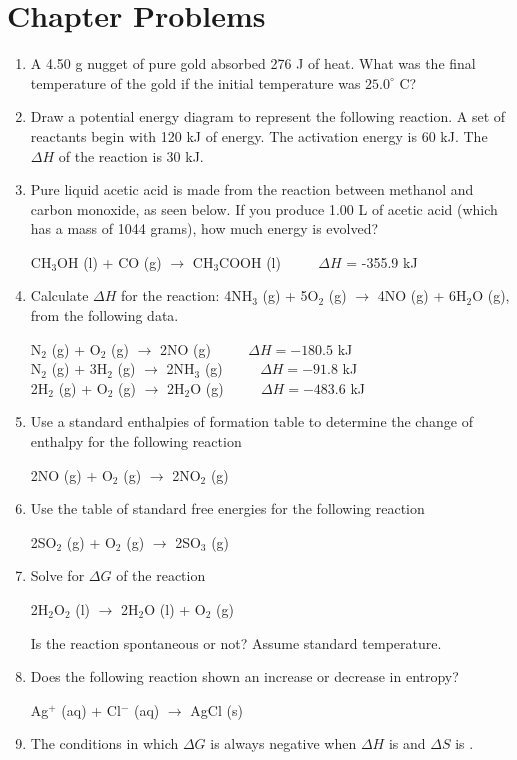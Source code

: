 \documentclass[../hchem.tex]{subfiles}
\begin{document}
\section*{Chapter Problems}
\begin{enumerate}
    \item A 4.50 g nugget of pure gold absorbed 276 J of heat. What was the final temperature of the gold if the initial temperature was $25.0^{\circ}$ C?
    \item Draw a potential energy diagram to represent the following reaction. A set of reactants begin with 120 kJ of energy. The activation energy is 60 kJ. The $\Delta H$ of the reaction is 30 kJ.
    \item Pure liquid acetic acid is made from the reaction between methanol and carbon monoxide, as seen below. If you produce 1.00 L of acetic acid (which has a mass of 1044 grams), how much energy is evolved?
    \begin{center}
        CH$_3$OH (l) + CO (g) $\rightarrow$ CH$_3$COOH (l) $\qquad$ $\Delta H$ = -355.9 kJ
    \end{center}
    \item Calculate $\Delta H$ for the reaction: 4NH$_3$ (g) + 5O$_2$ (g) $\rightarrow$ 4NO (g) + 6H$_2$O (g), from the following data.
    \begin{center}
        N$_2$ (g) + O$_2$ (g) $\rightarrow$ 2NO (g) $\qquad$ $\Delta H = -180.5$ kJ\\
        N$_2$ (g) + 3H$_2$ (g) $\rightarrow$ 2NH$_3$ (g) $\qquad$ $\Delta H = -91.8$ kJ\\
        2H$_2$ (g) + O$_2$ (g) $\rightarrow$ 2H$_2$O (g) $\qquad$ $\Delta H = -483.6$ kJ
    \end{center}
    \item Use a standard enthalpies of formation table to determine the change of enthalpy for the following reaction 
    \begin{center}
        2NO (g) + O$_2$ (g) $\rightarrow$ 2NO$_2$ (g)
    \end{center}
    \item Use the table of standard free energies for the following reaction 
    \begin{center}
        2SO$_2$ (g) + O$_2$ (g) $\rightarrow$ 2SO$_3$ (g)
    \end{center}
    \item Solve for $\Delta G$ of the reaction 
    \begin{center}
        2H$_2$O$_2$ (l) $\rightarrow$ 2H$_2$O (l) + O$_2$ (g)
    \end{center}
    Is the reaction spontaneous or not? Assume standard temperature.
    \item Does the following reaction shown an increase or decrease in entropy?
    \begin{center}
        Ag$^+$ (aq) + Cl$^-$ (aq) $\rightarrow$ AgCl (s)
    \end{center}
    \item The conditions in which $\Delta G$ is always negative when $\Delta H$ is \blank and $\Delta S$ is \blank.
\end{enumerate}
\end{document}
